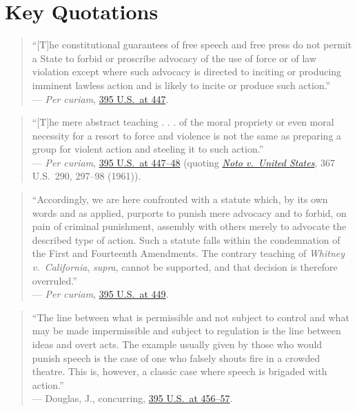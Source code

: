 \documentclass[12pt]{article}
\begin{document}
\section{Key Quotations}

\begin{quote}
``[T]he constitutional guarantees of free speech and free press do not permit a State to forbid or proscribe advocacy of the use of force or of law violation except where such advocacy is directed to inciting or producing imminent lawless action and is likely to incite or produce such action.'' \\
--- \emph{Per curiam}, \href{https://supreme.justia.com/cases/federal/us/395/444/}{395 U.S.\ at 447}.
\end{quote}

\begin{quote}
``[T]he mere abstract teaching . . . of the moral propriety or even moral necessity for a resort to force and violence is not the same as preparing a group for violent action and steeling it to such action.'' \\
--- \emph{Per curiam}, \href{https://supreme.justia.com/cases/federal/us/395/444/}{395 U.S.\ at 447--48} (quoting \href{https://supreme.justia.com/cases/federal/us/367/290/}{\emph{Noto v.\ United States}}, 367 U.S.\ 290, 297--98 (1961)).
\end{quote}

\begin{quote}
``Accordingly, we are here confronted with a statute which, by its own words and as applied, purports to punish mere advocacy and to forbid, on pain of criminal punishment, assembly with others merely to advocate the described type of action. Such a statute falls within the condemnation of the First and Fourteenth Amendments. The contrary teaching of \emph{Whitney v.\ California}, \emph{supra}, cannot be supported, and that decision is therefore overruled.'' \\
--- \emph{Per curiam}, \href{https://supreme.justia.com/cases/federal/us/395/444/}{395 U.S.\ at 449}.
\end{quote}

\begin{quote}
``The line between what is permissible and not subject to control and what may be made impermissible and subject to regulation is the line between ideas and overt acts. The example usually given by those who would punish speech is the case of one who falsely shouts fire in a crowded theatre. This is, however, a classic case where speech is brigaded with action.'' \\
--- Douglas, J., concurring, \href{https://supreme.justia.com/cases/federal/us/395/444/}{395 U.S.\ at 456--57}.
\end{quote}
\end{document}
